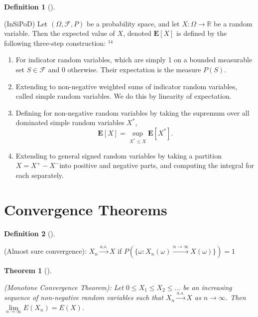 \documentclass[
  letterpaper,
  DIV=11,
  numbers=noendperiod]{scrreprt}
\theoremstyle{plain}
\newtheorem{theorem}{Theorem}[chapter]
\theoremstyle{definition}
\newtheorem{definition}{Definition}[chapter]
\theoremstyle{remark}
\begin{document}
\leavevmode{}%
\begin{definition}[]\label{def-InSiPoD}

(InSiPoD) Let \((\Omega, \mathcal{F}, P)\) be a probability space, and
let \(X: \Omega \rightarrow \mathbb{R}\) be a random variable. Then the
expected value of \(X\), denoted \(\mathbf{E}[X]\) is defined by the
following three-step construction: \({ }^{14}\)

\begin{enumerate}
\def\labelenumi{\arabic{enumi}.}
\item
  For indicator random variables, which are simply 1 on a bounded
  measurable set \(S \in \mathcal{F}\) and 0 otherwise. Their
  expectation is the measure \(P(S)\).
\item
  Extending to non-negative weighted sums of indicator random variables,
  called simple random variables. We do this by linearity of
  expectation.
\item
  Defining for non-negative random variables by taking the supremum over
  all dominated simple random variables \(X^*\), \[
  \mathbf{E}[X]=\sup _{X^* \leq X} \mathbf{E}\left[X^*\right] .
  \]
\item
  Extending to general signed random variables by taking a partition
  \(X=X^{+}-X^{-}\)into positive and negative parts, and computing the
  integral for each separately.
\end{enumerate}

\end{definition}

\hypertarget{convergence-theorems}{%
\section*{Convergence Theorems}\label{convergence-theorems}}


\leavevmode{}%
\begin{definition}[]\label{def-Almost-sure-convergence}

(Almost sure convergence): \(X_n \xrightarrow{a.s.}X\) if
\(P(\{\omega: X_n(\omega) \xrightarrow{n\to \infty} X(\omega)\}) = 1\)

\end{definition}

\leavevmode{}%
\begin{theorem}[]\label{thm-Monotone-Convergence-Theorem}

(Monotone Convergence Theorem): Let \(0 \leq X_1 \leq X_2 \leq ...\) be
an \textit{increasing sequence of non-negative} random variables such
that \(X_n \xrightarrow{a.s.} X\) as \(n\to \infty\). Then
\(\lim\limits_{n\to \infty}E(X_n) = E(X)\).

\end{theorem}
\end{document}
